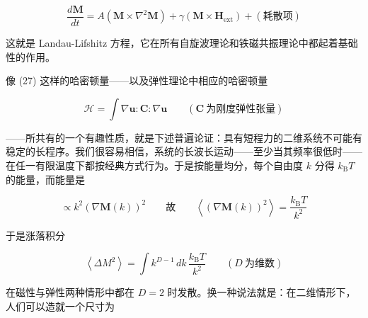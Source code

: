 \begin{equation*}
\frac{d\mathbf{M}}{dt} = A\left(\mathbf{M}\times\nabla^{2}\mathbf{M}\right) + \gamma\left(\mathbf{M}\times\mathbf{H}_{\mathrm{ext}}\right) + \left(\text{耗散项}\right)
\end{equation*}

这就是 Landau-Lifshitz 方程，它在所有自旋波理论和铁磁共振理论中都起着基础性的作用。

像 (27) 这样的哈密顿量——以及弹性理论中相应的哈密顿量

\begin{equation*}
\mathcal{H} = \int \nabla\mathbf{u}:\mathbf{C}:\nabla\mathbf{u} \qquad \left(\mathbf{C}\ \text{为刚度弹性张量}\right)
\end{equation*}

——所共有的一个有趣性质，就是下述普遍论证：具有短程力的二维系统不可能有稳定的长程序。我们很容易相信，系统的长波长运动——至少当其频率很低时——在任一有限温度下都按经典方式行为。于是按能量均分，每个自由度 $k$ 分得 $k_{\mathrm{B}}T$ 的能量，而能量是

\begin{equation*}
\propto k^{2}\left(\nabla\mathbf{M}(k)\right)^{2} \qquad \text{故} \qquad \left\langle\left(\nabla\mathbf{M}(k)\right)^{2}\right\rangle = \frac{k_{\mathrm{B}}T}{k^{2}}
\end{equation*}

于是涨落积分

\begin{equation*}
\left\langle\Delta M^{2}\right\rangle = \int k^{D-1}\,dk\,\frac{k_{\mathrm{B}}T}{k^{2}} \qquad \left(D\ \text{为维数}\right)
\end{equation*}

在磁性与弹性两种情形中都在 $D = 2$ 时发散。换一种说法就是：在二维情形下，人们可以造就一个尺寸为

